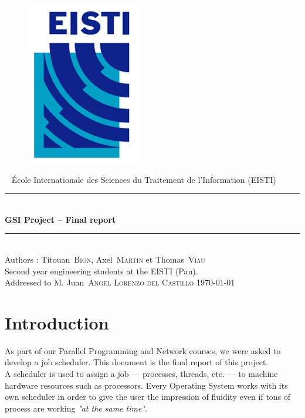 \documentclass[a4paper,11pt]{article}
\newcommand*{\HRule}{\rule{\linewidth}{0.4mm}}  %
\newcommand*{\auteur}[2]{\large #1~\textsc{#2}} %
\newcommand{\pretitre}{École Internationale des Sciences du Traitement de l'Information (EISTI)}
\newcommand{\grostitre}{GSI Project -- Final report}
\newcommand{\auteurs}{Authors : \auteur{Titouan}{Bion}, \auteur{Axel}{Martin} et \auteur{Thomas}{Viau} \\ Second year engineering students at the EISTI (Pau).}
\newcommand{\correcteurs}{Addressed to M. \auteur{Juan}{Angel Lorenzo del Castillo}}
\newcommand{\madate}{\today} %
\begin{document}


\begin{titlepage}
\begin{figure}[h]
\includegraphics[scale=1]{images/Logo_EISTI.png}
\hfill
\end{figure}
  \begin{center}
    ~
    \vfill
    {\large\pretitre\\}           %
    \vspace{2cm}
    \HRule \\[0.4cm]
    {\Huge\bf\grostitre\\[0.4cm]} %
    \HRule \\[0.4cm]
    \vspace{2cm}
    \auteurs\\                    %
    \medskip
    \vfill
   	\correcteurs
    \vfill
    {\large\madate}               %
  \end{center}
\end{titlepage}



\tableofcontents

\newpage

\section{Introduction}

As part of our Parallel Programming and Network courses, we were asked to develop a job scheduler. This document is the final report of this project.\\
A scheduler is used to assign a job --- processes, threads, etc. --- to machine hardware resources such as processors. Every Operating System works with its own scheduler in order to give the user the impression of fluidity even if tons of process are working \textit{"at the same time"}\cite{wiki:scheduler}.\\
\end{document}

